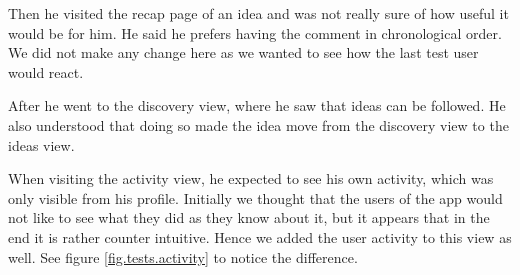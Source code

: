 \documentclass[a4paper,12pt, oneside]{article}
\begin{document}
Then he visited the recap page of an idea and was not really sure of how useful it would be for him.
He said he prefers having the comment in chronological order.
We did not make any change here as we wanted to see how the last test user would react.

After he went to the discovery view, where he saw that ideas can be followed.
He also understood that doing so made the idea move from the discovery view to the ideas view.

When visiting the activity view, he expected to see his own activity, which was only visible from his profile.
Initially we thought that the users of the app would not like to see what they did as they know about it, but it appears that in the end it is rather counter intuitive.
Hence we added the user activity to this view as well.
See figure \ref{fig.tests.activity} to notice the difference.
\end{document}
